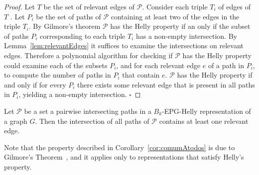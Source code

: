 \documentclass[runningheads]{llncs}
\begin{document}
\begin{proof}
Let $T$ be the set of relevant edges of $\mathcal{P}$. Consider each triple $T_i$ of edges of $T$ . Let $P_i$ be the set of paths of $\mathcal{P}$ containing at least two of the edges in the triple  $T_i$. By Gilmore’s theorem \cite{bergeDuchet1975} $\mathcal{P}$ has the Helly property if an only if the subset of paths $P_i$  corresponding to each triple  $T_i$  has a non-empty intersection.  By Lemma~\ref{lem:relevantEdges} it suffices to examine the intersections on relevant edges. Therefore a polynomial algorithm for checking if $\mathcal{P}$ has the Helly property could examine each of the subsets $P_i$, and for each relevant edge $e$ of a path in $P_i$, to compute the number of paths in $P_i$ that contain $e$. $\mathcal{P}$ has the Helly property if and only if for every  $P_i$  there exists some relevant edge that is present in all paths in $P_i$,  yielding a non-empty intersection.
$\square$ \end{proof}


\begin{corollary}\label{cor:comumAtodos}
Let ${\mathcal P}$ be a set a pairwise intersecting paths in a $B_k$-EPG-Helly representation of a graph $G$. Then the intersection of all paths of  ${\mathcal P}$ contains at least one relevant edge.
\end{corollary}

Note that the property described in Corollary~\ref{cor:comumAtodos} is due to Gilmore's Theorem~\cite{bergeDuchet1975}, and it applies only to representations that satisfy Helly's property.

\medskip


\end{document}
